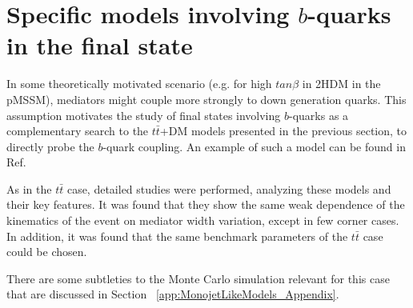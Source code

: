 
\section{Specific models involving $b$-quarks in the final state}

In some theoretically motivated scenario (e.g. for high $tan\beta$ in 2HDM in the pMSSM), 
\spinzero mediators might couple more strongly to down generation quarks.
 This assumption motivates the study of final states involving $b$-quarks 
 as a complementary search to the $t\bar
t$+DM models presented in the previous section, to directly probe the $b$-quark coupling. 
An example of such a model can be found in Ref.~\cite{Buckley:2014fba}

As in the $t\bar t$ case, detailed studies were performed, analyzing 
these models and their key features. It was found that they show the
same weak dependence of the kinematics of the event on mediator width
variation, except in few corner cases. In addition, it was found that
the same benchmark parameters of the $t\bar t$ case could be chosen.

There are some subtleties to the Monte Carlo simulation relevant for
this case that are discussed in Section ~\ref{app:MonojetLikeModels_Appendix}.

%
%
